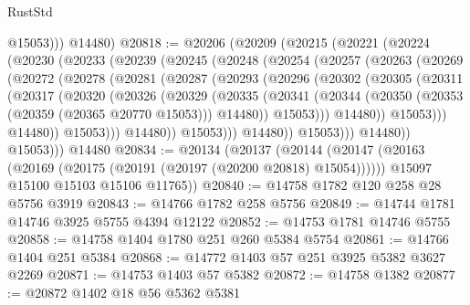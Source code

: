 \begin{lexlean}{RustStd}
\begin{coremodule}
            @15053)))
      @14480)
@20818 := @20206
    (@20209
      (@20215
        (@20221
          (@20224
            (@20230
              (@20233
                (@20239
                  (@20245
                    (@20248
                      (@20254
                        (@20257
                          (@20263
                            (@20269
                              (@20272
                                (@20278
                                  (@20281
                                    (@20287
                                      (@20293
                                        (@20296
                                          (@20302
                                            (@20305
                                              (@20311
                                                (@20317
                                                  (@20320
                                                    (@20326
                                                      (@20329
                                                        (@20335
                                                          (@20341
                                                            (@20344
                                                              (@20350
                                                                (@20353
                                                                  (@20359 (@20365 @20770 @15053)))
                                                                @14480))
                                                            @15053)))
                                                      @14480))
                                                  @15053)))
                                            @14480))
                                        @15053)))
                                  @14480))
                              @15053)))
                        @14480))
                    @15053)))
              @14480))
          @15053)))
    @14480
@20834 := @20134
    (@20137
      (@20144
        (@20147 (@20163 (@20169 (@20175 (@20191 (@20197 (@20200 @20818) @15054))))))
        @15097
        @15100
        @15103
        @15106
        @11765))
@20840 := @14758 @1782 @120 @258 @28 @5756 @3919
@20843 := @14766 @1782 @258 @5756
@20849 := @14744 @1781 @14746 @3925 @5755 @4394 @12122
@20852 := @14753 @1781 @14746 @5755
@20858 := @14758 @1404 @1780 @251 @260 @5384 @5754
@20861 := @14766 @1404 @251 @5384
@20868 := @14772 @1403 @57 @251 @3925 @5382 @3627 @2269
@20871 := @14753 @1403 @57 @5382
@20872 := @14758 @1382
@20877 := @20872 @1402 @18 @56 @5362 @5381

\end{coremodule}
\end{lexlean}
